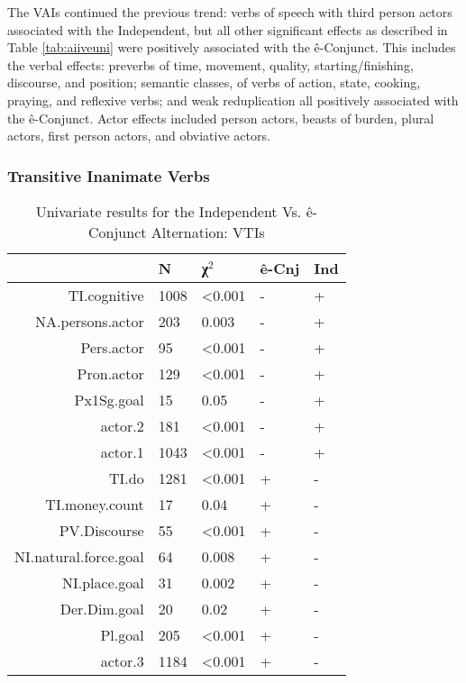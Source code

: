 The VAIs continued the previous trend: verbs of speech with third person actors associated with the Independent, but all other significant effects as described in Table \ref{tab:aiiveuni} were positively associated with the ê-Conjunct. This includes the verbal effects: preverbs of time, movement, quality, starting/finishing, discourse, and position; semantic classes, of verbs of action, state, cooking, praying, and reflexive verbs; and weak reduplication all positively associated with the ê-Conjunct. Actor effects included person actors, beasts of burden, plural actors, first person actors, and obviative actors.
\FloatBarrier
\FloatBarrier

\subsubsection{Transitive Inanimate Verbs}

\begin{table}[H]
  \centering
  \footnotesize
\begin{tabular}{rllll}
    \toprule
&N&χ$^{2}$&ê-Cnj&Ind\\
\midrule

TI.cognitive       &   1008 & \textless{}0.001 &  - &  + \\
NA.persons.actor   &    203   & 0.003           & -  & + \\
Pers.actor      &        95  & \textless{}0.001  & -  & + \\
Pron.actor       &      129 & \textless{}0.001  & -  & + \\
Px1Sg.goal        &      15  &   0.05       &    -   & + \\
actor.2            &    181 & \textless{}0.001 &  -  & + \\
actor.1             &  1043 & \textless{}0.001  & -  & + \\
TI.do                & 1281 & \textless{}0.001  & + &  - \\
TI.money.count        &  17  & 0.04           & +  & - \\
PV.Discourse           & 55 & \textless{}0.001 &  +  & - \\
NI.natural.force.goal   & 64 & 0.008            & +  & - \\
NI.place.goal       &    31 & 0.002         &    +  & - \\
Der.Dim.goal        &    20  & 0.02          &  + &  - \\
Pl.goal             &   205 & \textless{}0.001 &  +  & - \\
actor.3             &  1184 & \textless{}0.001 &  +  & - \\

  \bottomrule
  \end{tabular}
  \caption{
   Univariate results for the Independent Vs. ê-Conjunct Alternation: VTIs \\ \label{tab:tiiveuni}
  }
\end{table}

